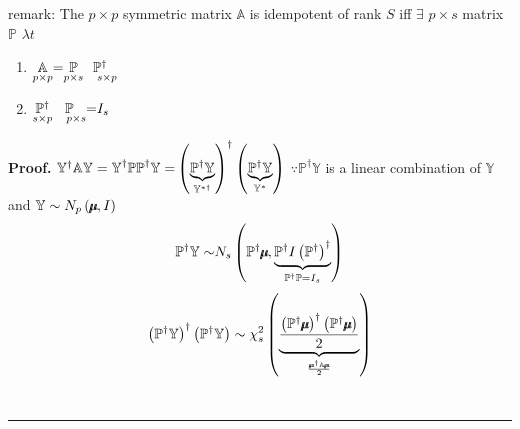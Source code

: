 \documentclass{article}
\newenvironment{proof}[1][Proof]{\noindent\textbf{#1.} }{\ \rule{0.5em}{0.5em}}
\begin{document}
\bigskip

remark: The $p\times p$ symmetric matrix $\mathbb{A}$ is idempotent of rank $%
S$ iff $\exists $ $p\times s$ matrix $\mathbb{P}$ $\lambda t$

\begin{enumerate}
\item $\underset{p\times p}{\mathbb{A}}\mathbb{=}\underset{p\times s}{%
\mathbb{P}}\underset{\quad s\times p}{\mathbb{P}^{\dagger }}$

\item $\underset{s\times p}{\mathbb{P}^{\dagger }}\underset{\quad p\times s}{%
\mathbb{P}}\mathbb{=}I_{s}$
\end{enumerate}

\begin{proof}
$\mathbb{Y}^{\mathbb{\dagger }}\mathbb{AY=Y}^{\mathbb{\dagger }}\mathbb{PP}%
^{\dagger }\mathbb{Y=}\left( \underset{\mathbb{Y}^{\ast \dagger }}{%
\underbrace{\mathbb{P}^{\dagger }\mathbb{Y}}}\right) ^{\dagger }\left( 
\underset{\mathbb{Y}^{\ast }}{\underbrace{\mathbb{P}^{\dagger }\mathbb{Y}}}%
\right) $\newline
\newline
$\because \mathbb{P}^{\dagger }\mathbb{Y}$ is a linear combination of $%
\mathbb{Y}$ and $\mathbb{Y}\sim N_{p}\left( \mathbb{%
\mu\mkern-12.3mu\mu%
},I\right) $%
\begin{equation*}
\therefore \mathbb{P}^{\dagger }\mathbb{Y\sim }N_{s}\left( \mathbb{P}%
^{\dagger }\mathbb{%
\mu\mkern-12.3mu\mu%
},\underset{\mathbb{P}^{\dagger }\mathbb{P}=I_{s}}{\underbrace{\mathbb{P}%
^{\dagger }I\left( \mathbb{P}^{\dagger }\right) ^{\dagger }}}\right)
\end{equation*}%
\begin{equation*}
\therefore \left( \mathbb{P}^{\dagger }\mathbb{Y}\right) ^{\dagger }\left( 
\mathbb{P}^{\dagger }\mathbb{Y}\right) \sim \chi _{s}^{2}\left( \underset{%
\frac{\mathbb{%
\mu\mkern-12.3mu\mu%
}^{\dagger }\mathbb{A%
\mu\mkern-12.3mu\mu%
}}{2}}{\underbrace{\frac{\left( \mathbb{P}^{\dagger }\mathbb{%
\mu\mkern-12.3mu\mu%
}\right) ^{\dagger }\left( \mathbb{P}^{\dagger }\mathbb{%
\mu\mkern-12.3mu\mu%
}\right) }{2}}}\right)
\end{equation*}
\end{proof}
\end{document}
